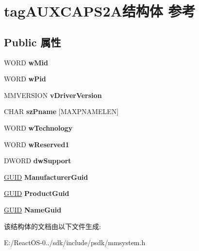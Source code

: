 \hypertarget{structtag_a_u_x_c_a_p_s2_a}{}\section{tag\+A\+U\+X\+C\+A\+P\+S2\+A结构体 参考}
\label{structtag_a_u_x_c_a_p_s2_a}
\subsection*{Public 属性}
\begin{DoxyCompactItemize}
\item 
\mbox{\label{structtag_a_u_x_c_a_p_s2_a_a330a2f7c401f29af93f0e42c850989dc}} 
W\+O\+RD {\bfseries w\+Mid}
\item 
\mbox{\label{structtag_a_u_x_c_a_p_s2_a_aedf4c9abac552fc939926ff45f8c2730}} 
W\+O\+RD {\bfseries w\+Pid}
\item 
\mbox{\label{structtag_a_u_x_c_a_p_s2_a_a2a50f99bc5554b5e0eb67bd4b9a5f272}} 
M\+M\+V\+E\+R\+S\+I\+ON {\bfseries v\+Driver\+Version}
\item 
\mbox{\label{structtag_a_u_x_c_a_p_s2_a_a23a887e0eb4d7076c778528d3be8a39f}} 
C\+H\+AR {\bfseries sz\+Pname} \mbox{[}M\+A\+X\+P\+N\+A\+M\+E\+L\+EN\mbox{]}
\item 
\mbox{\label{structtag_a_u_x_c_a_p_s2_a_ac009f2a8b65f47512880f5f29f61a5ad}} 
W\+O\+RD {\bfseries w\+Technology}
\item 
\mbox{\label{structtag_a_u_x_c_a_p_s2_a_ab252e19ceaaa0588a6493ac6c2113336}} 
W\+O\+RD {\bfseries w\+Reserved1}
\item 
\mbox{\label{structtag_a_u_x_c_a_p_s2_a_a483e256ca3ee3a9597bcb703a09674c2}} 
D\+W\+O\+RD {\bfseries dw\+Support}
\item 
\mbox{\label{structtag_a_u_x_c_a_p_s2_a_a1f7e188367ee4234d1a3c3cf20ba1aef}} 
\hyperlink{interface_g_u_i_d}{G\+U\+ID} {\bfseries Manufacturer\+Guid}
\item 
\mbox{\label{structtag_a_u_x_c_a_p_s2_a_a3893f499a89d26c4e9c95dece3db0111}} 
\hyperlink{interface_g_u_i_d}{G\+U\+ID} {\bfseries Product\+Guid}
\item 
\mbox{\label{structtag_a_u_x_c_a_p_s2_a_a8276c8829ebd04d53ef45d8c63ac2d70}} 
\hyperlink{interface_g_u_i_d}{G\+U\+ID} {\bfseries Name\+Guid}
\end{DoxyCompactItemize}


该结构体的文档由以下文件生成\+:\begin{DoxyCompactItemize}
\item 
E\+:/\+React\+O\+S-\/0../sdk/include/psdk/mmsystem.\+h\end{DoxyCompactItemize}
